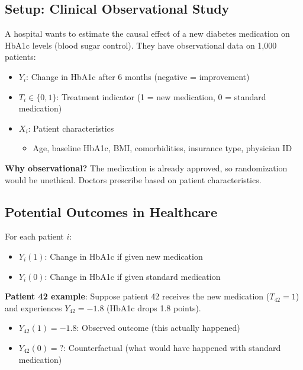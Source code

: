 \subsection{Setup: Clinical Observational
Study}\label{_setup_clinical_observational_study}

A hospital wants to estimate the causal effect of a new diabetes
medication on HbA1c levels (blood sugar control). They have
observational data on 1,000 patients:

\begin{itemize}
\item
  \(Y_i\): Change in HbA1c after 6 months (negative = improvement)
\item
  \(T_i \in \{0, 1\}\): Treatment indicator (1 = new medication, 0 =
  standard medication)
\item
  \(X_i\): Patient characteristics

  \begin{itemize}
  \item
    Age, baseline HbA1c, BMI, comorbidities, insurance type, physician
    ID
  \end{itemize}
\end{itemize}

\textbf{Why observational?} The medication is already approved, so
randomization would be unethical. Doctors prescribe based on patient
characteristics.

\subsection{Potential Outcomes in
Healthcare}\label{_potential_outcomes_in_healthcare}

For each patient $i$:
\begin{itemize}
\item $Y_i(1)$: Change in HbA1c if given new medication
\item $Y_i(0)$: Change in HbA1c if given standard medication
\end{itemize}

\textbf{Patient 42 example}: Suppose patient 42 receives the new
medication (\(T_{42} = 1\)) and experiences \(Y_{42} = -1.8\) (HbA1c
drops 1.8 points).

\begin{itemize}
\item
  \(Y_{42}(1) = -1.8\): Observed outcome (this actually happened)
\item
  \(Y_{42}(0) = ?\): Counterfactual (what would have happened with
  standard medication)
\end{itemize}

